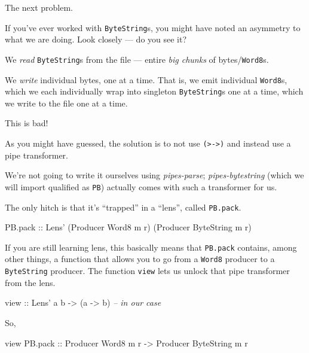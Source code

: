 \documentclass[]{article}
\newenvironment{Shaded}{}{}
\newcommand{\DataTypeTok}[1]{\textcolor[rgb]{0.56,0.13,0.00}{#1}}
\newcommand{\CommentTok}[1]{\textcolor[rgb]{0.38,0.63,0.69}{\textit{#1}}}
\newcommand{\OtherTok}[1]{\textcolor[rgb]{0.00,0.44,0.13}{#1}}
\newcommand{\NormalTok}[1]{#1}
\begin{document}
The next problem.

If you've ever worked with \texttt{ByteString}s, you might have noted an
asymmetry to what we are doing. Look closely --- do you see it?

We \emph{read} \texttt{ByteString}s from the file --- entire \emph{big chunks}
of bytes/\texttt{Word8}s.

We \emph{write} individual bytes, one at a time. That is, we emit individual
\texttt{Word8}s, which we each individually wrap into singleton
\texttt{ByteString}s one at a time, which we write to the file one at a time.

This is bad!

As you might have guessed, the solution is to not use
\texttt{(\textgreater{}-\textgreater{})} and instead use a pipe transformer.

We're not going to write it ourselves using \emph{pipes-parse};
\emph{pipes-bytestring} (which we will import qualified as \texttt{PB}) actually
comes with such a transformer for us.

The only hitch is that it's ``trapped'' in a ``lens'', called \texttt{PB.pack}.

\begin{Shaded}
\begin{Highlighting}[]
\NormalTok{PB.pack}\OtherTok{ ::} \DataTypeTok{Lens'}\NormalTok{ (}\DataTypeTok{Producer} \DataTypeTok{Word8}\NormalTok{ m r) (}\DataTypeTok{Producer} \DataTypeTok{ByteString}\NormalTok{ m r)}
\end{Highlighting}
\end{Shaded}

If you are still learning lens, this basically means that \texttt{PB.pack}
contains, among other things, a function that allows you to go from a
\texttt{Word8} producer to a \texttt{ByteString} producer. The function
\texttt{view} lets us unlock that pipe transformer from the lens.

\begin{Shaded}
\begin{Highlighting}[]
\OtherTok{view ::} \DataTypeTok{Lens'}\NormalTok{ a b }\OtherTok{->}\NormalTok{ (a }\OtherTok{->}\NormalTok{ b)       }\CommentTok{-- in our case}
\end{Highlighting}
\end{Shaded}

So,

\begin{Shaded}
\begin{Highlighting}[]
\NormalTok{view PB.pack}\OtherTok{ ::} \DataTypeTok{Producer} \DataTypeTok{Word8}\NormalTok{      m r}
             \OtherTok{->} \DataTypeTok{Producer} \DataTypeTok{ByteString}\NormalTok{ m r}
\end{Highlighting}
\end{Shaded}
\end{document}
